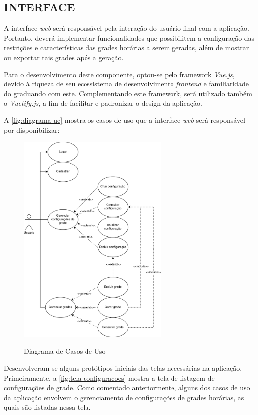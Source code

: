 \subsection{INTERFACE}

A interface \textit{web} será responsável pela interação do usuário final com a aplicação. Portanto, deverá implementar funcionalidades que possibilitem a configuração das restrições e características das grades horárias a serem geradas, além de mostrar ou exportar tais grades após a geração.

Para o desenvolvimento deste componente, optou-se pelo framework \textit{Vue.js}, devido à riqueza de seu ecossistema de desenvolvimento \textit{frontend} e familiaridade do graduando com este. Complementando este framework, será utilizado também o \textit{Vuetify.js}, a fim de facilitar e padronizar o design da aplicação.

A \autoref{fig:diagrama-uc} mostra os casos de uso que a interface \textit{web} será responsável por disponibilizar:

\begin{figure}[!htb]
	\centering
	\caption{Diagrama de Casos de Uso}
	\includegraphics[width=0.65\textwidth]{./dados/figuras/diagrama_uc}
	\label{fig:diagrama-uc}
\end{figure}
\newpage

Desenvolveram-se alguns protótipos iniciais das telas necessárias na aplicação.
Primeiramente, a \autoref{fig:tela-configuracoes} mostra a tela de listagem de configurações de grade. Como comentado anteriormente, alguns dos casos de uso da aplicação envolvem o gerenciamento de configurações de grades horárias, as quais são listadas nessa tela.

